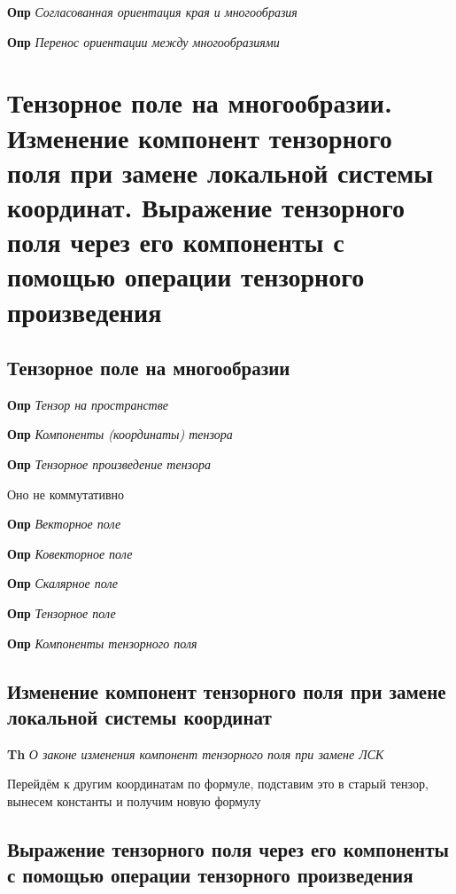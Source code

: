 \documentclass[a4paper, 14pt]{article}
\begin{document}
    \textbf{Опр} \textit{Согласованная ориентация края и многообразия}
    
    \textbf{Опр} \textit{Перенос ориентации между многообразиями}
    
    \section{Тензорное поле на многообразии.
    Изменение компонент тензорного поля при замене локальной системы координат.
    Выражение тензорного поля через его компоненты с помощью операции тензорного произведения}
    
    \subsection{Тензорное поле на многообразии}
    
    \textbf{Опр} \textit{Тензор на пространстве}
    
    \textbf{Опр} \textit{Компоненты (координаты) тензора}
    
    \textbf{Опр} \textit{Тензорное произведение тензора}
    
    Оно не коммутативно
    
    \textbf{Опр} \textit{Векторное поле}
    
    \textbf{Опр} \textit{Ковекторное поле}
    
    \textbf{Опр} \textit{Скалярное поле}
    
    \textbf{Опр} \textit{Тензорное поле}
    
    \textbf{Опр} \textit{Компоненты тензорного поля}
    
    \subsection{Изменение компонент тензорного поля при замене локальной системы координат}
    
    \textbf{Th} \textit{О законе изменения компонент тензорного поля при замене ЛСК}
    
    Перейдём к другим координатам по формуле, подставим это в старый тензор, вынесем константы и получим новую формулу
    
    \subsection{Выражение тензорного поля через его компоненты с помощью операции тензорного произведения}
    
\end{document}
